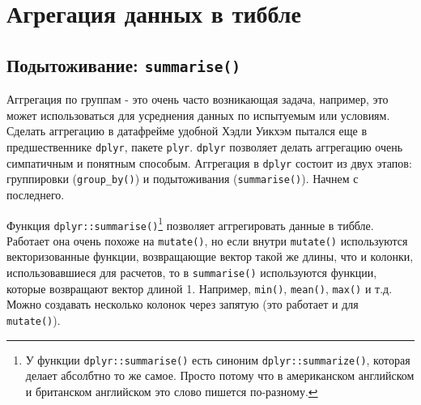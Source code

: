 \documentclass[
]{book}
\newenvironment{Shaded}{\begin{snugshade}}{\end{snugshade}}
\newcommand{\DataTypeTok}[1]{\textcolor[rgb]{0.13,0.29,0.53}{#1}}
\newcommand{\DecValTok}[1]{\textcolor[rgb]{0.00,0.00,0.81}{#1}}
\newcommand{\KeywordTok}[1]{\textcolor[rgb]{0.13,0.29,0.53}{\textbf{#1}}}
\newcommand{\NormalTok}[1]{#1}
\newcommand{\OperatorTok}[1]{\textcolor[rgb]{0.81,0.36,0.00}{\textbf{#1}}}
\newcommand{\OtherTok}[1]{\textcolor[rgb]{0.56,0.35,0.01}{#1}}
\newcommand{\StringTok}[1]{\textcolor[rgb]{0.31,0.60,0.02}{#1}}
\begin{document}
\hypertarget{tidy_aggregate}{%
\section{Агрегация данных в тиббле}\label{tidy_aggregate}}

\hypertarget{summarise}{%
\subsection{\texorpdfstring{Подытоживание: \texttt{summarise()}}{Подытоживание: summarise()}}\label{summarise}}

Аггрегация по группам - это очень часто возникающая задача, например, это может использоваться для усреднения данных по испытуемым или условиям. Сделать аггрегацию в датафрейме удобной Хэдли Уикхэм пытался еще в предшественнике \texttt{dplyr}, пакете \texttt{plyr}. \texttt{dplyr} позволяет делать аггрегацию очень симпатичным и понятным способым. Аггрегация в \texttt{dplyr} состоит из двух этапов: группировки (\texttt{group\_by()}) и подытоживания (\texttt{summarise()}). Начнем с последнего.

Функция \texttt{dplyr::summarise()}\footnote{У функции \texttt{dplyr::summarise()} есть синоним \texttt{dplyr::summarize()}, которая делает абсолбтно то же самое. Просто потому что в американском английском и британском английском это слово пишется по-разному.} позволяет аггрегировать данные в тиббле. Работает она очень похоже на \texttt{mutate()}, но если внутри \texttt{mutate()} используются векторизованные функции, возвращающие вектор такой же длины, что и колонки, использовавшиеся для расчетов, то в \texttt{summarise()} используются функции, которые возвращают вектор длиной 1. Например, \texttt{min()}, \texttt{mean()}, \texttt{max()} и т.д. Можно создавать несколько колонок через запятую (это работает и для \texttt{mutate()}).

\begin{Shaded}
\end{Shaded}
\end{document}
